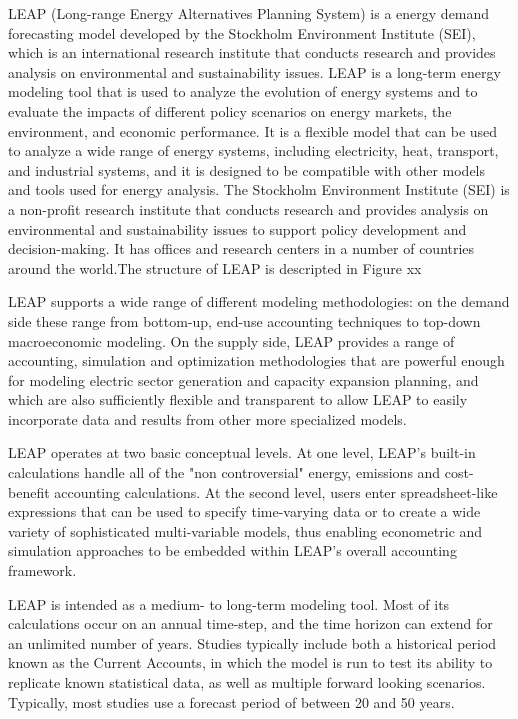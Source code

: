\documentclass[lettersize,journal]{IEEEtran}
\begin{document}
  LEAP (Long-range Energy Alternatives Planning System) is a energy demand forecasting model developed by the Stockholm Environment Institute (SEI), which is an international research institute that conducts research and provides analysis on environmental and sustainability issues. LEAP is a long-term energy modeling tool that is used to analyze the evolution of energy systems and to evaluate the impacts of different policy scenarios on energy markets, the environment, and economic performance. It is a flexible model that can be used to analyze a wide range of energy systems, including electricity, heat, transport, and industrial systems, and it is designed to be compatible with other models and tools used for energy analysis. The Stockholm Environment Institute (SEI) is a non-profit research institute that conducts research and provides analysis on environmental and sustainability issues to support policy development and decision-making. It has offices and research centers in a number of countries around the world.The structure of LEAP is descripted in Figure xx


  LEAP supports a wide range of different modeling methodologies: on the demand side these range from bottom-up, end-use accounting techniques to top-down macroeconomic modeling. On the supply side, LEAP provides a range of accounting, simulation and optimization methodologies that are powerful enough for modeling electric sector generation and capacity expansion planning, and which are also sufficiently flexible and transparent to allow LEAP to easily incorporate data and results from other more specialized models.

  LEAP operates at two basic conceptual levels. At one level, LEAP's built-in calculations handle all of the "non controversial" energy, emissions and cost-benefit accounting calculations. At the second level, users enter spreadsheet-like expressions that can be used to specify time-varying data or to create a wide variety of sophisticated multi-variable models, thus enabling econometric and simulation approaches to be embedded within LEAP’s overall accounting framework.
 
  LEAP  is intended as a medium- to long-term modeling tool. Most of its calculations occur on an annual time-step, and the time horizon can extend for an unlimited number of years. Studies typically include both a historical period known as the Current Accounts, in which the model is run to test its ability to replicate known statistical data, as well as multiple forward looking scenarios. Typically, most studies use a forecast period of between 20 and 50 years.\cite{leap}
  
\end{document}
